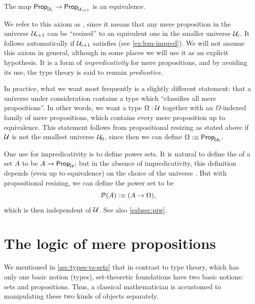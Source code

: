 \begin{axiom}
  The map $\mathsf{Prop}_{\mathcal{U}_i} \to \mathsf{Prop}_{\mathcal{U}_{i+1}}$ is an equivalence.
\end{axiom}

We refer to this axiom as ,
since it means that any mere proposition in the universe $\mathcal{U}_{i+1}$ can be ``resized'' to an equivalent one in the smaller universe $\mathcal{U}_i$.
It follows automatically if $\mathcal{U}_{i+1}$ satisfies \LEM{} (see \cref{ex:lem-impred}).
We will not assume this axiom in general, although in some places we will use it as an explicit hypothesis.
It is a form of \emph{impredicativity} for mere propositions, and by avoiding its use, the type theory is said to remain \emph{predicative}.
%
%

In practice, what we want most frequently is a slightly different statement: that a universe \UU under consideration contains a type which ``classifies all mere propositions''.
In other words, we want a type $\Omega:\mathcal{U}$ together with an $\Omega$-indexed family of mere propositions, which contains every mere proposition up to equivalence.
This statement follows from propositional resizing as stated above if $\mathcal{U}$ is not the smallest universe $\mathcal{U}_0$, since then we can define $\Omega\vcentcolon\equiv \mathsf{Prop}_{\mathcal{U}_0}$.

One use for impredicativity is to define power sets.
It is natural to define the  of a set $A$ to be $A\to\mathsf{Prop}_\mathcal{U}$; but in the absence of impredicativity, this definition depends
(even up to equivalence) on the choice of the universe \UU.
But with propositional resizing, we can define the power set to be
%
\[ \mathcal{P}(A) \vcentcolon\equiv (A\to\Omega),\]
which is then independent of $\mathcal{U}$.
See also \cref{subsec:piw}.


\section{The logic of mere propositions}
\label{subsec:logic-hprop}

%
We mentioned in \cref{sec:types-vs-sets} that in contrast to type theory, which has only one basic notion (types), set-theoretic foundations have two basic notions: sets and propositions.
Thus, a classical mathematician is accustomed to manipulating these two kinds of objects separately.

